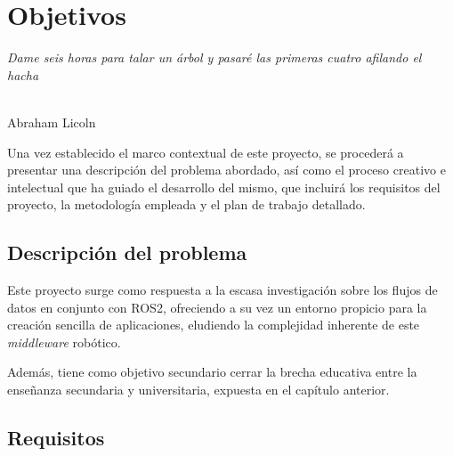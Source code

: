 \chapter{Objetivos}
\label{cap:capitulo2}

\begin{flushright}
\begin{minipage}[]{10cm}
\emph{Dame seis horas para talar un árbol y pasaré las primeras cuatro afilando el hacha}\\
\end{minipage}\\

Abraham Licoln\\
\end{flushright}

\vspace{1cm}

Una vez establecido el marco contextual de este proyecto, se procederá a
presentar una descripción del problema abordado, así como el proceso creativo e
intelectual que ha guiado el desarrollo del mismo, que incluirá los requisitos
del proyecto, la metodología empleada y el plan de trabajo detallado.


\section{Descripción del problema}
\label{sec:descripcion}

Este proyecto surge como respuesta a la escasa investigación sobre los flujos de
datos en conjunto con ROS2, ofreciendo a su vez un entorno propicio para la
creación sencilla de aplicaciones, eludiendo la complejidad inherente de este
\textit{middleware} robótico.

Además, tiene como objetivo secundario cerrar la brecha educativa entre la
enseñanza secundaria y universitaria, expuesta en el capítulo anterior.


\section{Requisitos}
\label{sec:requisitos}

